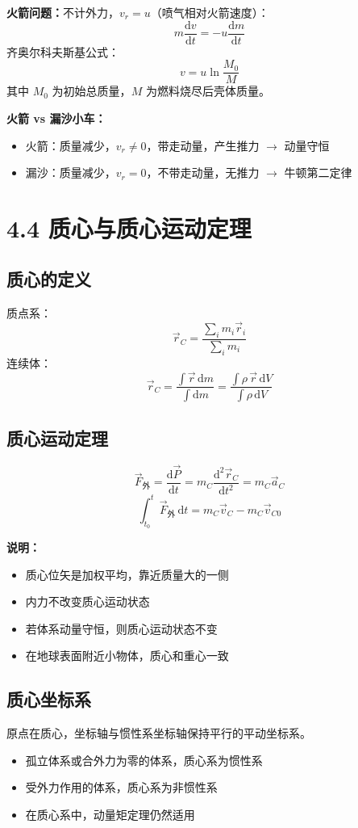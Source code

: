\documentclass{ctexart}
\begin{document}
\textbf{火箭问题：}不计外力，$v_r = u$（喷气相对火箭速度）：
\[
m\frac{\mathrm{d}v}{\mathrm{d}t} = -u\frac{\mathrm{d}m}{\mathrm{d}t}
\]
齐奥尔科夫斯基公式：
\[
v = u\ln\frac{M_0}{M}
\]
其中 $M_0$ 为初始总质量，$M$ 为燃料烧尽后壳体质量。

\textbf{火箭 vs 漏沙小车：}
\begin{itemize}
  \item 火箭：质量减少，$v_r \neq 0$，带走动量，产生推力 $\to$ 动量守恒
  \item 漏沙：质量减少，$v_r = 0$，不带走动量，无推力 $\to$ 牛顿第二定律
\end{itemize}

\section*{4.4 质心与质心运动定理}

\subsection*{质心的定义}
质点系：
\[
\vec{r}_C = \frac{\sum_i m_i \vec{r}_i}{\sum_i m_i}
\]
连续体：
\[
\vec{r}_C = \frac{\int \vec{r}\,\mathrm{d}m}{\int \mathrm{d}m} = \frac{\int \rho\,\vec{r}\,\mathrm{d}V}{\int \rho\,\mathrm{d}V}
\]

\subsection*{质心运动定理}
\[
\vec{F}_{\text{外}} = \frac{\mathrm{d}\vec{P}}{\mathrm{d}t} = m_C \frac{\mathrm{d}^{2}\vec{r}_C}{\mathrm{d}t^{2}} = m_C \vec{a}_C
\]
\[
\int_{t_0}^{t} \vec{F}_{\text{外}}\,\mathrm{d}t = m_C \vec{v}_C - m_C \vec{v}_{C0}
\]

\textbf{说明：}
\begin{itemize}
  \item 质心位矢是加权平均，靠近质量大的一侧
  \item 内力不改变质心运动状态
  \item 若体系动量守恒，则质心运动状态不变
  \item 在地球表面附近小物体，质心和重心一致
\end{itemize}

\subsection*{质心坐标系}
原点在质心，坐标轴与惯性系坐标轴保持平行的平动坐标系。
\begin{itemize}
  \item 孤立体系或合外力为零的体系，质心系为惯性系
  \item 受外力作用的体系，质心系为非惯性系
  \item 在质心系中，动量矩定理仍然适用
\end{itemize}
\end{document}
